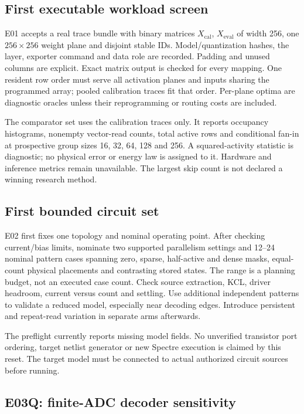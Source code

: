 \normalsize

\subsection{First executable workload screen}

E01 accepts a real trace bundle with binary matrices $X_{\mathrm{cal}}$, $X_{\mathrm{eval}}$
of width 256, one $256\times256$ weight plane and disjoint stable IDs. Model/quantization
hashes, the layer, exporter command and data role are recorded. Padding and unused
columns are explicit. Exact matrix output is checked for every mapping.
One resident row order must serve all activation planes and inputs sharing the programmed
array; pooled calibration traces fit that order. Per-plane optima are diagnostic oracles
unless their reprogramming or routing costs are included.

The comparator set uses the calibration traces only. It reports occupancy histograms,
nonempty vector-read counts, total active rows and conditional fan-in at prospective
group sizes 16, 32, 64, 128 and 256. A squared-activity statistic is diagnostic; no physical
error or energy law is assigned to it. Hardware and inference metrics remain unavailable.
The largest skip count is not declared a winning research method.

\subsection{First bounded circuit set}

E02 first fixes one topology and nominal operating point. After checking current/bias
limits, nominate two supported parallelism settings and 12--24 nominal pattern cases
spanning zero, sparse, half-active and dense masks, equal-count physical placements and
contrasting stored states. The range is a planning budget, not an executed case count.
Check source extraction, KCL, driver headroom, current versus count and settling. Use
additional independent patterns to validate a reduced model, especially near decoding
edges. Introduce persistent and repeat-read variation in separate arms afterwards.

The preflight currently reports missing model fields. No unverified transistor port
ordering, target netlist generator or new Spectre execution is claimed by this reset.
The target model must be connected to actual authorized circuit sources before running.

\subsection{E03Q: finite-ADC decoder sensitivity}

